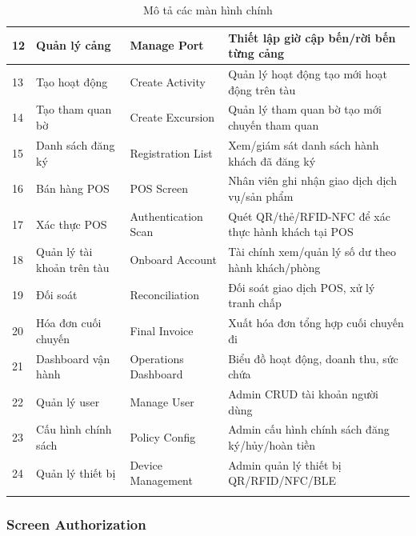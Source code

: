 \begin{longtable}{|p{0.6cm}|p{3.2cm}|p{3.2cm}|p{6.5cm}|}
    \hline
    12 & Quản lý cảng & Manage Port & Thiết lập giờ cập bến/rời bến từng
    cảng \\
    \hline
    13 & Tạo hoạt động & Create Activity & Quản lý hoạt động tạo mới hoạt
    động trên tàu \\
    \hline
    14 & Tạo tham quan bờ & Create Excursion & Quản lý tham quan bờ tạo
    mới chuyến tham quan \\
    \hline
    15 & Danh sách đăng ký & Registration List & Xem/giám sát danh sách
    hành khách đã đăng ký \\
    \hline
    16 & Bán hàng POS & POS Screen & Nhân viên ghi nhận giao dịch dịch
    vụ/sản phẩm \\
    \hline
    17 & Xác thực POS & Authentication Scan & Quét QR/thẻ/RFID-NFC để xác
    thực hành khách tại POS \\
    \hline
    18 & Quản lý tài khoản trên tàu & Onboard Account & Tài chính xem/quản
    lý số dư theo hành khách/phòng \\
    \hline
    19 & Đối soát & Reconciliation & Đối soát giao dịch POS, xử lý tranh
    chấp \\
    \hline
    20 & Hóa đơn cuối chuyến & Final Invoice & Xuất hóa đơn tổng hợp cuối
    chuyến đi \\
    \hline
    21 & Dashboard vận hành & Operations Dashboard & Biểu đồ hoạt động,
    doanh thu, sức chứa \\
    \hline
    22 & Quản lý user & Manage User & Admin CRUD tài khoản người dùng \\
    \hline
    23 & Cấu hình chính sách & Policy Config & Admin cấu hình chính sách
    đăng ký/hủy/hoàn tiền \\
    \hline
    24 & Quản lý thiết bị & Device Management & Admin quản lý thiết bị
    QR/RFID/NFC/BLE \\
    \hline
    \caption{Mô tả các màn hình chính}
    \label{tab:screen-descriptions}
\end{longtable}

\subsubsection{Screen Authorization}


